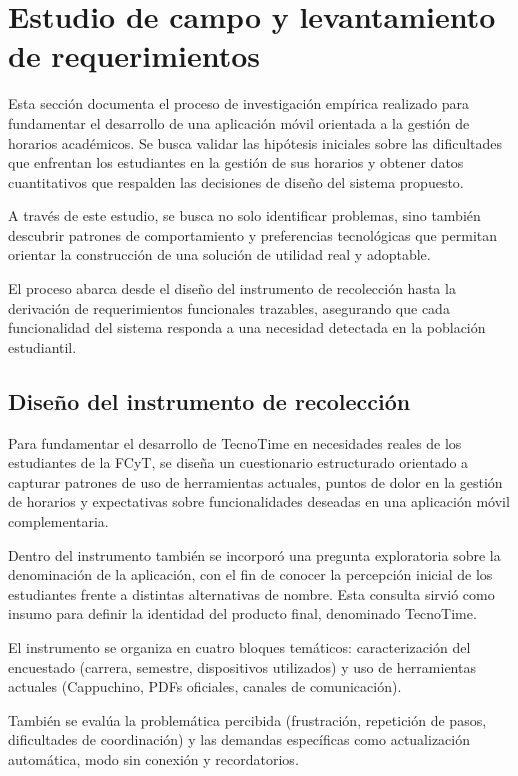 \section{Estudio de campo y levantamiento de requerimientos}

Esta sección documenta el proceso de investigación empírica realizado para fundamentar el desarrollo de una aplicación móvil orientada a la gestión de horarios académicos. Se busca validar las hipótesis iniciales sobre las dificultades que enfrentan los estudiantes en la gestión de sus horarios y obtener datos cuantitativos que respalden las decisiones de diseño del sistema propuesto.

A través de este estudio, se busca no solo identificar problemas, sino también descubrir patrones de comportamiento y preferencias tecnológicas que permitan orientar la construcción de una solución de utilidad real y adoptable.

El proceso abarca desde el diseño del instrumento de recolección hasta la derivación de requerimientos funcionales trazables, asegurando que cada funcionalidad del sistema responda a una necesidad detectada en la población estudiantil.

\subsection{Diseño del instrumento de recolección}

Para fundamentar el desarrollo de TecnoTime en necesidades reales de los estudiantes de la FCyT, se diseña un cuestionario estructurado orientado a capturar patrones de uso de herramientas actuales, puntos de dolor en la gestión de horarios y expectativas sobre funcionalidades deseadas en una aplicación móvil complementaria.

Dentro del instrumento también se incorporó una pregunta exploratoria sobre la denominación de la aplicación, con el fin de conocer la percepción inicial de los estudiantes frente a distintas alternativas de nombre. Esta consulta sirvió como insumo para definir la identidad del producto final, denominado TecnoTime.

El instrumento se organiza en cuatro bloques temáticos: caracterización del encuestado (carrera, semestre, dispositivos utilizados) y uso de herramientas actuales (Cappuchino, PDFs oficiales, canales de comunicación).

También se evalúa la problemática percibida (frustración, repetición de pasos, dificultades de coordinación) y las demandas específicas como actualización automática, modo sin conexión y recordatorios.


